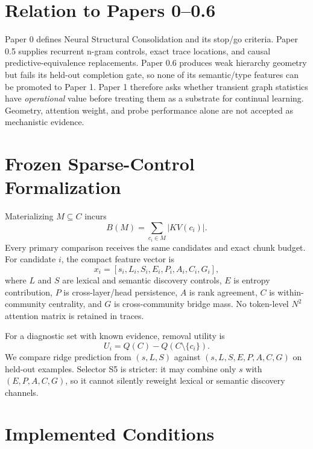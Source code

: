 \documentclass[10pt]{article}
\begin{document}
\section{Relation to Papers 0--0.6}

Paper 0 defines Neural Structural Consolidation and its stop/go criteria. Paper 0.5 supplies recurrent n-gram controls, exact trace locations, and causal predictive-equivalence replacements. Paper 0.6 produces weak hierarchy geometry but fails its held-out completion gate, so none of its semantic/type features can be promoted to Paper 1. Paper 1 therefore asks whether transient graph statistics have \emph{operational} value before treating them as a substrate for continual learning. Geometry, attention weight, and probe performance alone are not accepted as mechanistic evidence.

\section{Frozen Sparse-Control Formalization}

Materializing $M\subseteq C$ incurs
\[
B(M)=\sum_{c_i\in M}|KV(c_i)|.
\]
Every primary comparison receives the same candidates and exact chunk budget. For candidate $i$, the compact feature vector is
\[
x_i=[s_i,L_i,S_i,E_i,P_i,A_i,C_i,G_i],
\]
where $L$ and $S$ are lexical and semantic discovery controls, $E$ is entropy contribution, $P$ is cross-layer/head persistence, $A$ is rank agreement, $C$ is within-community centrality, and $G$ is cross-community bridge mass. No token-level $N^2$ attention matrix is retained in traces.

For a diagnostic set with known evidence, removal utility is
\[
U_i=Q(C)-Q(C\setminus\{c_i\}).
\]
We compare ridge prediction from $(s,L,S)$ against $(s,L,S,E,P,A,C,G)$ on held-out examples. Selector S5 is stricter: it may combine only $s$ with $(E,P,A,C,G)$, so it cannot silently reweight lexical or semantic discovery channels.

\section{Implemented Conditions}
\end{document}

